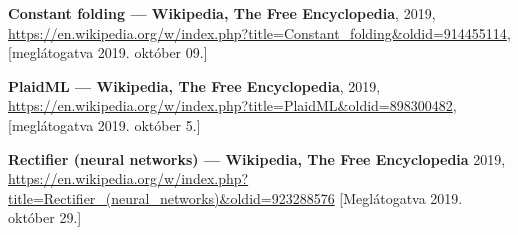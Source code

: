 \begin{thebibliography}{9}
	
	\textbf{Constant folding --- {Wikipedia}{,} The Free Encyclopedia},
	2019,
	\newline\url{https://en.wikipedia.org/w/index.php?title=Constant_folding&oldid=914455114},
	[meglátogatva 2019. október 09.]
	
	\textbf{PlaidML --- {Wikipedia}{,} The Free Encyclopedia},
	2019,
	\newline\url{https://en.wikipedia.org/w/index.php?title=PlaidML&oldid=898300482},
	[meglátogatva 2019. október 5.]
	
	\textbf{Rectifier (neural networks) --- {Wikipedia}{,} The Free Encyclopedia}
	2019,
	\newline\url{ https://en.wikipedia.org/w/index.php?title=Rectifier_(neural_networks)&oldid=923288576}
	[Meglátogatva 2019. október 29.]
\end{thebibliography}